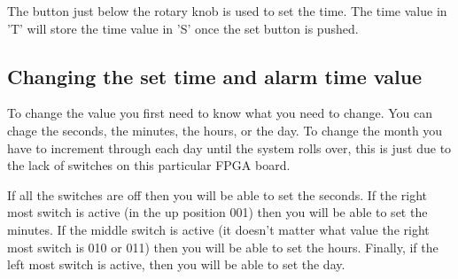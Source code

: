 \documentclass[12pt,a4paper,hidelinks]{article}            %
\begin{document}
The button just below the rotary knob is used to set the time. The time value in 'T' will store the time value in 'S' once the set button is pushed.

\subsection{Changing the set time and alarm time value}

To change the value you first need to know what you need to change. You can chage the seconds, the minutes, the hours, or the day. To change the month you have to increment through each day until the system rolls over, this is just due to the lack of switches on this particular FPGA board.

\begin{figure}[H]
\centering
{}
\label{fig:setswitches}
\end{figure}

If all the switches are off then you will be able to set the seconds. If the right most switch is active (in the up position 001) then you will be able to set the minutes. If the middle switch is active (it doesn't matter what value the right most switch is 010 or 011) then you will be able to set the hours. Finally, if the left most switch is active, then you will be able to set the day.

\begin{figure}[H]
\centering
{}
\label{fig:incdecvalue}
\end{figure}
\end{document}
